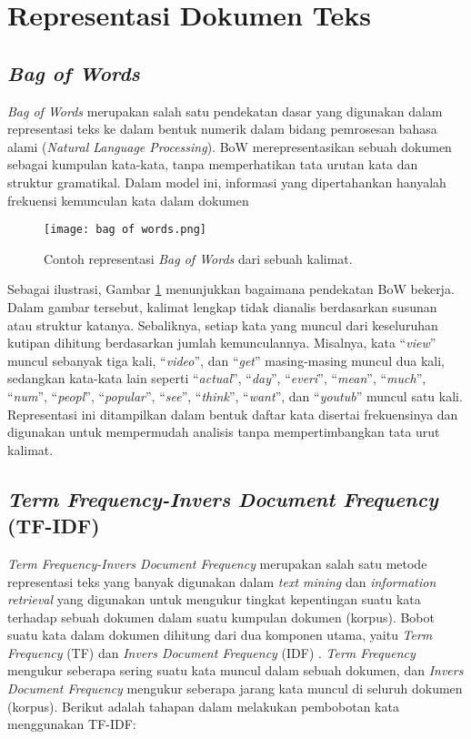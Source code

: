 \documentclass[a4paper,12pt]{report}
\numberwithin{equation}{chapter}
\begin{document}
\section{Representasi Dokumen Teks}
\label{sec:Representasi}

\subsection{\textit{Bag of Words}}
\label{subsec:BoW}
\textit{Bag of Words} merupakan salah satu pendekatan dasar yang digunakan dalam representasi teks ke dalam bentuk numerik dalam bidang pemrosesan bahasa alami (\textit{Natural Language Processing}). BoW merepresentasikan sebuah dokumen sebagai kumpulan kata-kata, tanpa memperhatikan tata urutan kata dan struktur gramatikal. Dalam model ini, informasi yang dipertahankan hanyalah frekuensi kemunculan kata dalam dokumen \citep{lane2019nlp} 

\begin{figure}
    \centering
    \texttt{[image: bag of words.png]}
    \caption{Contoh representasi \textit{Bag of Words} dari sebuah kalimat.}
    \label{fig:bow_example}
\end{figure}


Sebagai ilustrasi, Gambar \ref{fig:bow_example} menunjukkan bagaimana pendekatan BoW bekerja. Dalam gambar tersebut, kalimat lengkap tidak dianalis berdasarkan susunan atau struktur katanya. Sebaliknya, setiap kata yang muncul dari keseluruhan kutipan dihitung berdasarkan jumlah kemunculannya. Misalnya, kata ``\textit{view}'' muncul sebanyak tiga kali, ``\textit{video}'', dan ``\textit{get}'' masing-masing muncul dua kali, sedangkan kata-kata lain seperti ``\textit{actual}'', ``\textit{day}'', ``\textit{everi}'', ``\textit{mean}'', ``\textit{much}'', ``\textit{num}'', ``\textit{peopl}'', ``\textit{popular}'', ``\textit{see}'', ``\textit{think}'', ``\textit{want}'', dan ``\textit{youtub}''
muncul satu kali. Representasi ini ditampilkan dalam bentuk daftar kata disertai frekuensinya dan digunakan untuk mempermudah analisis tanpa mempertimbangkan tata urut kalimat.

\subsection{\textit{Term Frequency-Invers Document Frequency} (TF-IDF)}
\label{subsec:TF-IDF}
\textit{Term Frequency-Invers Document Frequency} merupakan salah satu metode representasi teks yang banyak digunakan dalam \textit{text mining} dan \textit{information retrieval} yang digunakan untuk mengukur tingkat kepentingan suatu kata terhadap sebuah dokumen dalam suatu kumpulan dokumen (korpus). Bobot suatu kata dalam dokumen dihitung dari dua komponen utama, yaitu \textit{Term Frequency} (TF) dan \textit{Invers Document Frequency} (IDF) \citep{lane2019nlp}. \textit{Term Frequency} mengukur seberapa sering suatu kata muncul dalam sebuah dokumen, dan \textit{Invers Document Frequency} mengukur seberapa jarang kata muncul di seluruh dokumen (korpus). Berikut adalah tahapan dalam melakukan pembobotan kata menggunakan TF-IDF:
\end{document}
